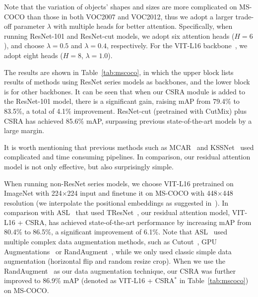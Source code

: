 \documentclass[10pt,twocolumn,letterpaper]{article}
\begin{document}
Note that the variation of objects' shapes and sizes are more complicated on MS-COCO than those in both VOC2007 and VOC2012, thus we adopt a larger trade-off parameter $\lambda$ with multiple heads for better attention. Specifically, when running ResNet-101 and ResNet-cut models, we adopt six attention heads ($H=6$), and choose $\lambda=0.5$ and $\lambda=0.4$, respectively. For the VIT-L16 backbone~\cite{VIT}, we adopt eight heads ($H=8$, $\lambda=1.0$).

The results are shown in Table~\ref{tab:mscoco}, in which the upper block lists results of methods using ResNet series models as backbones, and the lower block is for other backbones. It can be seen that when our CSRA module is added to the ResNet-101 model, there is a significant gain, raising mAP from 79.4\% to 83.5\%, a total of 4.1\% improvement. ResNet-cut (pretrained with CutMix) plus CSRA has achieved 85.6\% mAP, surpassing previous state-of-the-art models by a large margin. 

It is worth mentioning that previous methods such as MCAR~\cite{2020_arxiv_Gaobb} and KSSNet~\cite{2018_ACM_KD} used complicated and time consuming pipelines. In comparison, our residual attention model is not only effective, but also surprisingly simple.

When running non-ResNet series models, we choose VIT-L16 pretrained on ImageNet with 224$\times$224 input and finetune it on MS-COCO with 448$\times$448 resolution (we interpolate the positional embeddings as suggested in~\cite{VIT}). In comparison with ASL~\cite{ASL_2020_arxiv} that used TResNet~\cite{Tresnet}, our residual attention model, VIT-L16 + CSRA, has achieved state-of-the-art performance by increasing mAP from 80.4\% to 86.5\%, a significant improvement of 6.1\%. Note that ASL~\cite{ASL_2020_arxiv} used multiple complex data augmentation methods, such as Cutout~\cite{cutout}, GPU Augmentations~\cite{ASL_2020_arxiv} or RandAugment~\cite{randaugment}, while we only used classic simple data augmentation (horizontal flip and random resize crop). When we use the RandAugment~\cite{randaugment} as our data augmentation technique, our CSRA was further improved to 86.9\% mAP (denoted as VIT-L16 + CSRA$^*$ in Table~\ref{tab:mscoco}) on MS-COCO.
\end{document}
